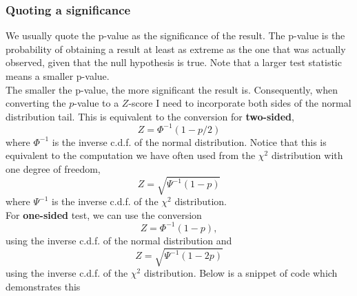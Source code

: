 \documentclass[12pt,a4paper]{article}
\begin{document}
\subsubsection{Quoting a significance}
We usually quote the p-value as the significance of the result. The p-value is the probability of obtaining a result at least as extreme as the one that was actually observed, given that the null hypothesis is true. Note that a larger test statistic means a smaller p-value.\\
The smaller the p-value, the more significant the result is.
Consequently, when converting the $p$-value to a $Z$-score I need to incorporate both sides of the normal distribution tail. This is equivalent to the conversion for \textbf{two-sided},
\begin{equation*}
Z=\Phi^{-1}(1-p / 2)
\end{equation*}
where $\Phi^{-1}$ is the inverse c.d.f. of the normal distribution. Notice that this is equivalent to the computation we have often used from the $\chi^2$ distribution with one degree of freedom,
\begin{equation*}
Z=\sqrt{\Psi^{-1}(1-p)}
\end{equation*}
where $\Psi^{-1}$ is the inverse c.d.f. of the $\chi^2$ distribution.
\\
For\textbf{ one-sided} test, we can use the conversion
\begin{equation*}
Z=\Phi^{-1}(1-p),
\end{equation*}
using the inverse c.d.f. of the normal distribution and
\begin{equation*}
Z=\sqrt{\Psi^{-1}(1-2 p)}
\end{equation*}
using the inverse c.d.f. of the $\chi^2$ distribution. Below is a snippet of code which demonstrates this
\end{document}
